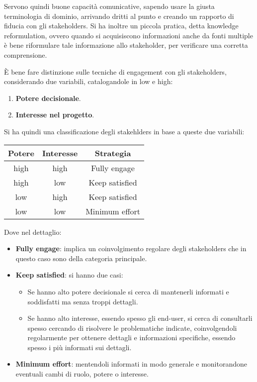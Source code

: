 Servono quindi buone capacità comunicative, sapendo usare la giusta terminologia
di dominio, arrivando dritti al punto e creando un rapporto di fiducia con gli
stakeholders. Si ha inoltre un piccola pratica, detta knowledge reformulation,
ovvero quando si acquisiscono informazioni anche da fonti multiple è bene riformulare
tale informazione allo stakeholder, per verificare una corretta comprensione.

È bene fare distinzione sulle tecniche di engagement con gli stakeholders,
considerando due variabili, catalogandole in low e high:
\begin{enumerate}
    \item \textbf{Potere decisionale}.
    \item \textbf{Interesse nel progetto}.
\end{enumerate}
Si ha quindi una classificazione degli stakehlders in base a queste due variabili:
\begin{table}[!ht]
    \centering
    \begin{tabular}{c|c|c}
        \textbf{Potere} & \textbf{Interesse} & \textbf{Strategia} \\\hline
        high            & high               & Fully engage       \\
        high            & low                & Keep satisfied     \\
        low             & high               & Keep satisfied     \\
        low             & low                & Minimum effort
    \end{tabular}
\end{table}
Dove nel dettaglio:
\begin{itemize}
    \item \textbf{Fully engage}: implica un coinvolgimento regolare degli
          stakeholders che in questo caso sono della categoria principale.
    \item \textbf{Keep satisfied}: si hanno due casi:
          \begin{itemize}
              \item Se hanno alto potere decisionale si cerca di mantenerli informati
                    e soddisfatti ma senza troppi dettagli.
              \item Se hanno alto interesse, essendo spesso gli end-user, si cerca di
                    consultarli spesso cercando di risolvere le problematiche indicate, coinvolgendoli
                    regolarmente per ottenere dettagli e informazioni specifiche, essendo
                    spesso i più informati sui dettagli.
          \end{itemize}
    \item \textbf{Minimum effort}: mentendoli informati in modo generale e
          monitorandone eventuali cambi di ruolo, potere o interesse.
\end{itemize}
